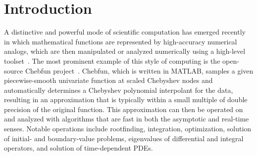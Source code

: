 \chapter{Introduction}
\label{intro}

A distinctive and powerful mode of scientific computation has emerged recently in which mathematical functions are represented by high-accuracy numerical analogs, which are then manipulated or analyzed numerically using a high-level toolset~\cite{Trefethen2015}. The most prominent example of this style of computing is the open-source Chebfun project~\cite{battles2004extension,Driscoll2014}. Chebfun, which is written in MATLAB, samples a given piecewise-smooth univariate function at scaled Chebyshev nodes and automatically determines a Chebyshev polynomial interpolant for the data, resulting in an approximation that is typically within a small multiple of double precision of the original function. This approximation can then be operated on and analyzed with algorithms that are fast in both the asymptotic and real-time senses. Notable operations include rootfinding, integration, optimization, solution of initial- and boundary-value problems, eigenvalues of differential and integral operators, and solution of time-dependent PDEs.

